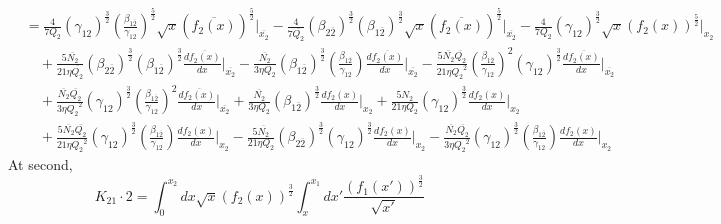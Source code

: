 \documentclass[fleqn, 10pt]{article}
\begin{document}
            \begin{equation}
            \begin{split}
            & =   \frac{4}{7Q_2} (\gamma_{12})^\frac{3}{2} \left(\frac{\beta_{1\overline{2}}}{\gamma_{12}}\right)^\frac{5}{2} \sqrt{x} (\overline{f_2(x)})^\frac{5}{2} \Bigg|_{\overline{x_2}} -   \frac{4}{7 \overline{Q_2}} (\beta_{2\overline{2}})^\frac{3}{2} (\beta_{1\overline{2}})^\frac{3}{2} \sqrt{x} (\overline{f_2(x)})^\frac{5}{2} \Bigg|_{\overline{x_2}} -  \frac{4}{7 Q_2} (\gamma_{12})^\frac{3}{2} \sqrt{x} (f_2(x))^\frac{5}{2} \Bigg|_{x_2} \\ & \quad +   \frac{5 \overline{N_2}}{21 \eta \overline{Q_2}} (\beta_{2\overline{2}})^\frac{3}{2} (\beta_{1\overline{2}})^\frac{3}{2} \frac{d\overline{f_2(x)}}{dx} \Bigg|_{\overline{x_2}}  -   \frac{\overline{N_2}}{3 \eta Q_2} (\beta_{1\overline{2}})^\frac{3}{2} \left(\frac{\beta_{1\overline{2}}}{\gamma_{12}}\right) \frac{d\overline{f_2(x)}}{dx} \Bigg|_{\overline{x_2}} -    \frac{5 \overline{N_2} \overline{Q_2}}{21 \eta {Q_2}^2} \left(\frac{\beta_{1\overline{2}}}{\gamma_{12}}\right)^2 (\gamma_{12})^\frac{3}{2} \frac{d\overline{f_2(x)}}{dx} \Bigg|_{\overline{x_2}} \\ & \quad +  \frac{\overline{N_2} \overline{Q_2}}{3 \eta {Q_2}^2} (\gamma_{12})^\frac{3}{2} \left(\frac{\beta_{1\overline{2}}}{\gamma_{12}}\right)^2 \frac{d\overline{f_2(x)}}{dx} \Bigg|_{\overline{x_2}} +  \frac{\overline{N_2}}{3 \eta Q_2} (\beta_{1\overline{2}})^\frac{3}{2} \frac{df_2(x)}{dx} \Bigg|_{x_2} +  \frac{5 N_2}{21 \eta Q_2} (\gamma_{12})^\frac{3}{2} \frac{df_2(x)}{dx} \Bigg|_{x_2}  \\ & \quad +   \frac{5 \overline{N_2} \overline{Q_2}}{21 \eta {Q_2}^2} (\gamma_{12})^\frac{3}{2} \left(\frac{\beta_{1\overline{2}}}{\gamma_{12}}\right) \frac{df_2(x)}{dx} \Bigg|_{x_2}  -  \frac{5 \overline{N_2}}{21 \eta Q_2} (\beta_{2\overline{2}})^\frac{3}{2} (\gamma_{12})^\frac{3}{2} \frac{df_2(x)}{dx} \Bigg|_{x_2} -   \frac{\overline{N_2} \overline{Q_2}}{3 \eta {Q_2}^2} (\gamma_{12})^\frac{3}{2} \left(\frac{\beta_{1\overline{2}}}{\gamma_{12}}\right) \frac{df_2(x)}{dx} \Bigg|_{x_2}
            \end{split}
            \end{equation}
            At second,
            \begin{equation}
            K_{21} \cdot 2 = \int^{x_2}_0 dx \sqrt{x} (f_2(x))^\frac{3}{2} \int^{x_1}_{x} dx' \frac{(f_1(x'))^\frac{3}{2}}{\sqrt{x'}}
            \label{86}
            \end{equation}
\end{document}
